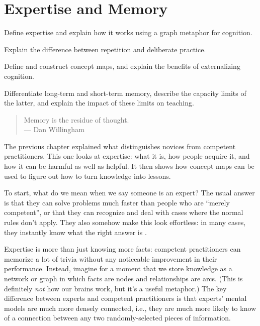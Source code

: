 \chapter{Expertise and Memory}\label{s:memory}

\begin{objectives}

\item
  Define expertise and explain how it works using a graph metaphor for
  cognition.

\item
  Explain the difference between repetition and deliberate practice.

\item
  Define and construct concept maps, and explain the benefits of
  externalizing cognition.

\item
  Differentiate long-term and short-term memory, describe the capacity
  limits of the latter, and explain the impact of these limits on
  teaching.

\end{objectives}

\begin{quote}

  Memory is the residue of thought. \\
  --- Dan Willingham

\end{quote}

The previous chapter explained what distinguishes novices from
competent practitioners. This one looks at expertise: what it is, how
people acquire it, and how it can be harmful as well as helpful.  It
then shows how concept maps can be used to figure out how to turn
knowledge into lessons.

To start, what do we mean when we say someone is an expert? The usual
answer is that they can solve problems much faster than people who are
``merely competent'', or that they can recognize and deal with cases
where the normal rules don't apply. They also somehow make this look
effortless: in many cases, they instantly know what the right answer
is \cite{Parn2017}.

Expertise is more than just knowing more facts: competent
practitioners can memorize a lot of trivia without any noticeable
improvement in their performance. Instead, imagine for a moment that
we store knowledge as a network or graph in which facts are nodes and
relationships are arcs. (This is definitely \emph{not} how our brains
work, but it's a useful metaphor.) The key difference between experts
and competent practitioners is that experts' mental models are much
more densely connected, i.e., they are much more likely to know of a
connection between any two randomly-selected pieces of information.

